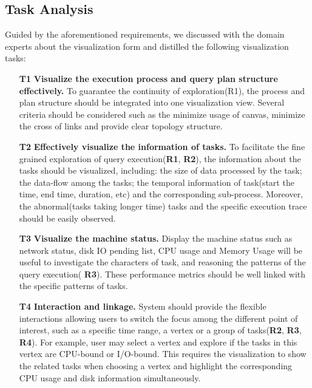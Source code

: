 \subsection{Task Analysis}
Guided by the aforementioned requirements, we discussed with the domain experts about the visualization form and distilled the following visualization tasks:

\begin{itemize}
  \item[\textbf{T1}]\textbf{Visualize the execution process and query plan structure effectively.} To guarantee the continuity of exploration(R1), the process and plan structure should be integrated into one visualization view. Several criteria should be considered such as the minimize usage of canvas, minimize the cross of links and provide clear topology structure.
  \item[\textbf{T2}]\textbf{Effectively visualize the information of tasks.} To facilitate the fine grained exploration of query execution(\textbf{R1}, \textbf{R2}), the information about the tasks should be visualized, including: the size of data processed by the task; the data-flow among the tasks; the temporal information of task(start the time, end time, duration, etc) and the corresponding sub-process. Moreover, the abnormal(tasks taking longer time) tasks and the specific execution trace should be easily observed.
  \item[\textbf{T3}]\textbf{Visualize the machine status.} Display the machine status such as network status, disk IO pending list, CPU usage and Memory Usage will be useful to investigate the characters of task, and reasoning the patterns of the query execution( \textbf{R3}). These performance metrics should be well linked with the specific patterns of tasks. 
  \item[\textbf{T4}]\textbf{Interaction and linkage.} System should provide the flexible interactions allowing users to switch the focus among the different point of interest, such as a specific time range, a vertex or a group of tasks(\textbf{R2}, \textbf{R3}, \textbf{R4}). For example, user may select a vertex and explore if the tasks in this vertex are CPU-bound or I/O-bound. This requires the visualization to show the related tasks when choosing a vertex and highlight the corresponding CPU usage and disk information simultaneously.


\end{itemize}


